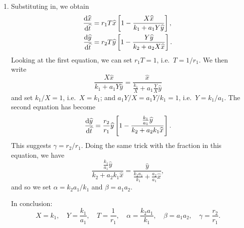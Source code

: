 \documentclass[a4paper, 12pt]{article}
\begin{document}
\begin{enumerate}[label={\bf \arabic{*}.\;}, ref={\arabic{*}},itemsep=3ex, left=0ex]
{\begin{enumerate}[label=(\alph*)]
      \end{enumerate}
    }
    {
      \begin{enumerate}[label=(\alph*)]
        \item Substituting in, we obtain
          \begin{subequations}
            \begin{align}
              \fd{\hat{x}}{\hat{t}} &= r_1T\hat{x}\left[1-\frac{X\hat{x}}{k_1 + a_1 Y\hat{y}}\right],\\
              \fd{\hat{y}}{\hat{t}} &= r_2 T \hat{y}\left[1-\frac{Y\hat{y}}{k_2 + a_2 X\hat{x}}\right].
            \end{align}
          \end{subequations}
          Looking at the first equation, we can set $r_1 T = 1$, i.e.\ $T=1/r_1$. We then write
          \begin{equation}
            \frac{X\hat{x}}{k_1 + a_1 Y\hat{y}}  =\frac{\hat{x}}{ \frac{k_1}{X} + a_1\frac{Y}{X}\hat{y}}
          \end{equation}
          and set $k_1/X=1$, i.e.\ $X=k_1$; and $a_1Y/X = a_1 Y/k_1 = 1$, i.e.\ $Y=k_1/a_1$. The second equation has become
          \begin{equation}
            \fd{\hat{y}}{\hat{t}} = \frac{r_2}{r_1} \hat{y}\left[1-\frac{\frac{k_1}{a_1}\hat{y}}{k_2 + a_2 k_1\hat{x}}\right].
          \end{equation}
          This suggests $\gamma = r_2/r_1$.  Doing the same trick with the fraction in this equation, we have
          \begin{equation}
            \frac{\frac{k_1}{a_1}\hat{y}}{k_2 + a_2 k_1\hat{x}} =
            \frac{\hat{y}}{\frac{k_2a_1}{k_1} + \frac{a_2}{a_1}\hat{x}},
          \end{equation}
          and so we set $\alpha = k_2a_1/k_1$ and $\beta = a_1 a_2$.

          In conclusion:
          \begin{equation}
            X = k_1, \quad Y=\frac{k_1}{a_1}, \quad T=\frac{1}{r_1}, \quad \alpha = \frac{k_2a_1}{k_1 }, \quad \beta = a_1 a_2, \quad \gamma = \frac{r_2}{r_1}.
          \end{equation}


\end{enumerate}}
\end{enumerate}
\end{document}
